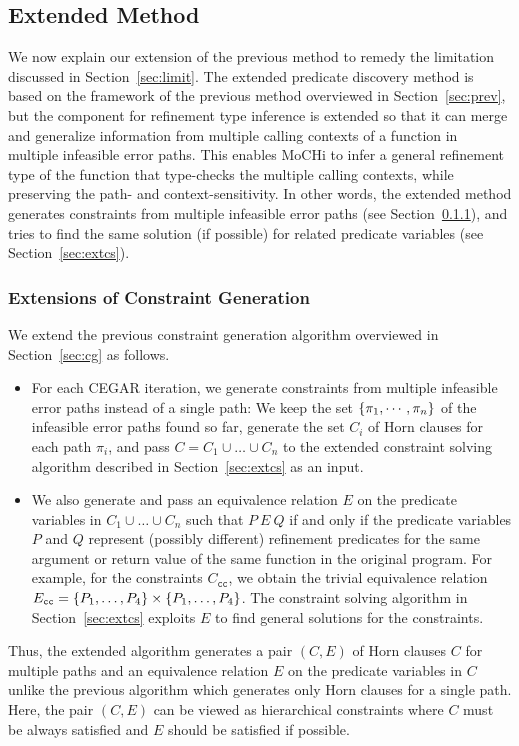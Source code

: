 \subsection{Extended Method}
\label{sec:ext}

We now explain our extension of the previous method to remedy the
limitation discussed in Section~\ref{sec:limit}.  The extended predicate
discovery method is based on the framework of the previous method
overviewed in Section~\ref{sec:prev}, but the component for refinement
type inference is extended so that it can merge and generalize
information from multiple calling contexts of a function in multiple
infeasible error paths.  This enables MoCHi to infer a general
refinement type of the function that type-checks the multiple calling
contexts, while preserving the path- and context-sensitivity.  In other
words, the extended method generates constraints from multiple
infeasible error paths (see Section~\ref{sec:extcg}), and tries to find
the same solution (if possible) for related predicate variables (see
Section~\ref{sec:extcs}).

\subsubsection{Extensions of Constraint Generation}
\label{sec:extcg}

We extend the previous constraint generation algorithm overviewed in
Section~\ref{sec:cg} as follows.
\begin{itemize}
\item For each CEGAR iteration, we generate constraints from multiple
infeasible error paths instead of a single path:  We keep the set
\(\{{\pi_1,\cdots,\pi_n}\}\) of the infeasible error paths found so far,
generate the set \(C_i\) of Horn clauses for each path \(\pi_i\), and
pass \(C=C_1 \cup \dots \cup C_n\) to the extended constraint solving
algorithm described in Section~\ref{sec:extcs} as an input.
\item We also generate and pass an equivalence relation \(E\) on the
predicate variables in \(C_1 \cup \dots \cup C_n\) such that \(P\ E\ Q\)
if and only if the predicate variables \(P\) and \(Q\) represent
(possibly different) refinement predicates for the same argument or
return value of the same function in the original program.  For example,
for the constraints \(C_{\texttt{cc}}\), we obtain the trivial
equivalence relation \(E_{\texttt{cc}}=\{{P_1,\dots,P_4}\} \times
\{{P_1,\dots,P_4}\}\).  The constraint solving algorithm in
Section~\ref{sec:extcs} exploits \(E\) to find general solutions for the
constraints.
\end{itemize}
Thus, the extended algorithm generates a pair \((C,E)\) of Horn clauses
\(C\) for multiple paths and an equivalence relation \(E\) on the
predicate variables in \(C\) unlike the previous algorithm which
generates only Horn clauses for a single path.  Here, the pair \((C,E)\)
can be viewed as hierarchical constraints where \(C\) must be always
satisfied and \(E\) should be satisfied if possible.

